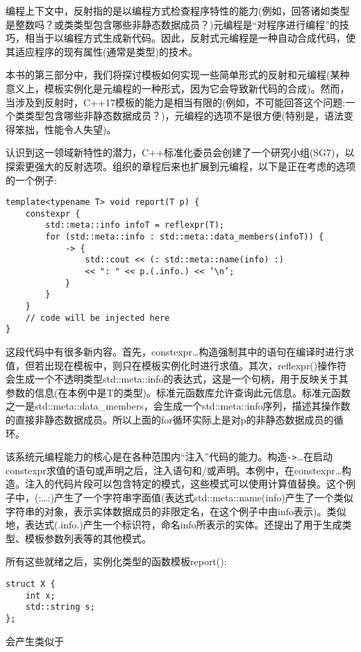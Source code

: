 编程上下文中，反射指的是以编程方式检查程序特性的能力(例如，回答诸如类型是整数吗？或类类型包含哪些非静态数据成员？)元编程是“对程序进行编程”的技巧，相当于以编程方式生成新代码。因此，反射式元编程是一种自动合成代码，使其适应程序的现有属性(通常是类型)的技术。

本书的第三部分中，我们将探讨模板如何实现一些简单形式的反射和元编程(某种意义上，模板实例化是元编程的一种形式，因为它会导致新代码的合成)。然而，当涉及到反射时，C++17模板的能力是相当有限的(例如，不可能回答这个问题:一个类类型包含哪些非静态数据成员？)，元编程的选项不是很方便(特别是，语法变得笨拙，性能令人失望)。

认识到这一领域新特性的潜力，C++标准化委员会创建了一个研究小组(SG7)，以探索更强大的反射选项。组织的章程后来也扩展到元编程，以下是正在考虑的选项的一个例子:

\begin{lstlisting}[style=styleCXX]
template<typename T> void report(T p) {
	constexpr {
		std::meta::info infoT = reflexpr(T);
		for (std::meta::info : std::meta::data_members(infoT)) {
			-> {
				std::cout << (: std::meta::name(info) :)
				<< ": " << p.(.info.) << ’\n’;
			}
		}
	}
	// code will be injected here
}
\end{lstlisting}

这段代码中有很多新内容。首先，constexpr{…}构造强制其中的语句在编译时进行求值，但若出现在模板中，则只在模板实例化时进行求值。其次，reflexpr()操作符会生成一个不透明类型std::meta::info的表达式，这是一个句柄，用于反映关于其参数的信息(在本例中是T的类型)。标准元函数库允许查询此元信息。标准元函数之一是std::meta::data\_members，会生成一个std::meta::info序列，描述其操作数的直接非静态数据成员。所以上面的for循环实际上是对p的非静态数据成员的循环。

该系统元编程能力的核心是在各种范围内“注入”代码的能力。构造\texttt{->}{…}在启动constexpr求值的语句或声明之后，注入语句和/或声明。本例中，在constexpr{…}构造。注入的代码片段可以包含特定的模式，这些模式可以使用计算值替换。这个例子中，(:…:)产生了一个字符串字面值(表达式std::meta::name(info)产生了一个类似字符串的对象，表示实体数据成员的非限定名，在这个例子中由info表示)。类似地，表达式(.info.)产生一个标识符，命名info所表示的实体。还提出了用于生成类型、模板参数列表等的其他模式。

所有这些就绪之后，实例化类型的函数模板report():

\begin{lstlisting}[style=styleCXX]
struct X {
	int x;
	std::string s;
};
\end{lstlisting}

会产生类似于

